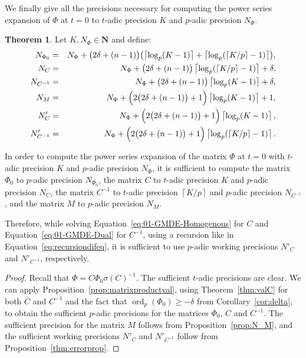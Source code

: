 \documentclass[a4paper,11pt]{article}
\numberwithin{equation}{section}
\providecommand{\ceil}[1]{\left\lceil#1\right\rceil}   %
\newcommand{\NN}{\mathbf{N}} %
\DeclareMathOperator{\ord}{ord}          %
\theoremstyle{definition}
\newtheorem{thm}{Theorem}[section]
\begin{document}
We finally give all the precisions necessary for computing the power series 
expansion of $\Phi$ at $t=0$ to $t$-adic precision $K$ and $p$-adic 
precision $N_{\Phi}$.

\begin{thm} \label{thm:Ni}
Let $K,N_{\Phi} \in \NN$ and define:
\begin{eqnarray*}
N_{\Phi_0}   		&=& N_{\Phi}+\bigl(2\delta+(n-1)\bigr) \bigl( \ceil{\log_p(K-1)} + \ceil{\log_p(\ceil{K/p}-1)}\bigr),\\
N_{C}				&=& N_{\Phi}+\bigl(2\delta+(n-1)\bigr) \ceil{ \log_p(\ceil{K/p}-1)} + \delta, \\
N_{C^{-1}}			&=& N_{\Phi}+\bigl(2\delta+(n-1)\bigr) \ceil{\log_p(K-1)} + \delta, \\
N_M                 &=& N_{\Phi}+\Bigl(2\bigl(2 \delta + (n-1)\bigr) + 1\Bigr) \ceil{\log_p(K-1)}+1, \\
N'_C			    &=& N_{\Phi}+\Bigl(2 \bigl(2 \delta + (n-1)\bigr) + 1\Bigr) \ceil{\log_p(K-1)}, \\
N'_{C^{-1}}	        &=& N_{\Phi}+\Bigl(2 \bigl(2 \delta + (n-1)\bigr) + 1\Bigr) \ceil{\log_p(\ceil{K/p}-1)}.
\end{eqnarray*}

In order to compute the power series expansion 
of the matrix $\Phi$ at $t=0$ with $t$-adic precision $K$ and $p$-adic precision $N_{\Phi}$,
it is sufficient to compute
the matrix $\Phi_0$ to $p$-adic precision $N_{\Phi_0}$,
the matrix $C$ to $t$-adic precision $K$ and $p$-adic precision $N_{C}$, 
the matrix $C^{-1}$ to $t$-adic precision $\ceil{K/p}$ and $p$-adic precision 
$N_{C^{-1}}$, and 
the matrix $M$ to $p$-adic precision $N_M$.

Therefore, while solving Equation~\eqref{eq:01-GMDE-Homogenous} for $C$ and 
Equation~\eqref{eq:01-GMDE-Dual} for $C^{-1}$, using a recursion like in 
Equation~\eqref{eq:recursiondifeq}, it is sufficient to use $p$-adic 
working precisions $N'_C$ and $N'_{C^{-1}}$, respectively.
\end{thm}

\begin{proof}
Recall that $\Phi = C \Phi_0 \sigma(C)^{-1}$. The sufficient $t$-adic 
precisions are clear. We can apply Proposition~\ref{prop:matrixproductval}, 
using Theorem~\ref{thm:valC} for both $C$ and $C^{-1}$ and the fact that 
$\ord_p(\Phi_0) \geq -\delta$ from Corollary~\ref{cor:delta}, to obtain 
the sufficient $p$-adic precisions for the matrices $\Phi_0$, $C$ and $C^{-1}$. 
The sufficient precision for the matrix $M$ follows from Proposition~\ref{prop:N_M},
and the sufficient working precisions $N'_C$ and $N'_{C^{-1}}$
follow from Proposition~\ref{thm:errorprop}.
\end{proof}
\end{document}
